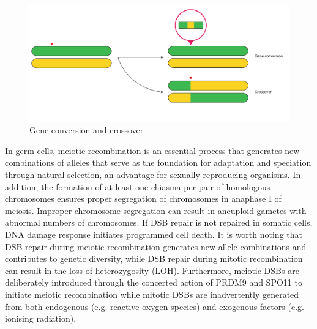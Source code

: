 \begin{figure}[htbp!]
\caption{Gene conversion and crossover}
\label{figure:homologous-recombination}
\begin{centering}
\includegraphics[width=\textwidth]{meiotic_recombination.pdf}
\end{centering}
\end{figure}

In germ cells, meiotic recombination is an essential process that generates new combinations of alleles that serve as the foundation for adaptation and speciation through natural selection, an advantage for sexually reproducing organisms. In addition, the formation of at least one chiasma per pair of homologous chromosomes ensures proper segregation of chromosomes in anaphase I of meiosis. Improper chromosome segregation can result in aneuploid gametes with abnormal numbers of chromosomes. If DSB repair is not repaired in somatic cells, DNA damage response initiates programmed cell death. It is worth noting that DSB repair during meiotic recombination generates new allele combinations and contributes to genetic diversity, while DSB repair during mitotic recombination can result in the loss of heterozygosity (LOH). Furthermore, meiotic DSBs are deliberately introduced through the concerted action of PRDM9 and SPO11 to initiate meiotic recombination while mitotic DSBs are inadvertently generated from both endogenous (e.g. reactive oxygen species) and exogenous factors (e.g. ionising radiation).

